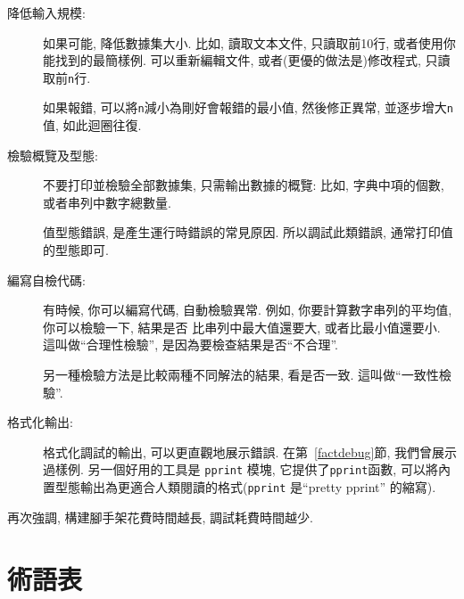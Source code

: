 \documentclass[10pt]{book}
\begin{document}
\begin{description}

\item[降低輸入規模:] 如果可能, 降低數據集大小. 比如, 讀取文本文件, 
只讀取前10行, 或者使用你能找到的最簡樣例. 
可以重新編輯文件, 或者(更優的做法是)修改程式, 只讀取前{\tt n}行. 

如果報錯, 可以將{\tt n}減小為剛好會報錯的最小值, 
然後修正異常, 並逐步增大{\tt n}值, 如此迴圈往復. 

\item[檢驗概覽及型態:] 不要打印並檢驗全部數據集, 只需輸出數據的概覽:
比如, 字典中項的個數, 或者串列中數字總數量. 

值型態錯誤, 是產生運行時錯誤的常見原因. 
所以調試此類錯誤, 通常打印值的型態即可. 

\item[編寫自檢代碼:]  有時候, 你可以編寫代碼, 自動檢驗異常. 
例如, 你要計算數字串列的平均值, 你可以檢驗一下, 結果是否
比串列中最大值還要大, 或者比最小值還要小. 這叫做``合理性檢驗'', 
是因為要檢查結果是否``不合理''.  

另一種檢驗方法是比較兩種不同解法的結果, 看是否一致. 
這叫做``一致性檢驗''. 

\item[格式化輸出:] 格式化調試的輸出, 可以更直觀地展示錯誤. 
在第~\ref{factdebug}節, 我們曾展示過樣例. 另一個好用的工具是 {\tt pprint} 模塊, 
它提供了{\tt pprint}函數, 可以將內置型態輸出為更適合人類閱讀的格式({\tt pprint}
是``pretty pprint'' 的縮寫).

\end{description}

再次強調, 構建腳手架花費時間越長, 調試耗費時間越少. 


\section{術語表}
\end{document}
